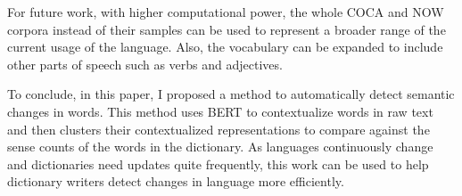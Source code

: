 \documentclass[11pt]{article}
\begin{document}
For future work, with higher computational power, the whole COCA and NOW corpora instead of their samples can be used to represent a broader range of the current usage of the language.
Also, the vocabulary can be expanded to include other parts of speech such as verbs and adjectives.

To conclude, in this paper, I proposed a method to automatically detect semantic changes in words.
This method uses BERT to contextualize words in raw text and then clusters their contextualized representations to compare against the sense counts of the words in the dictionary.
As languages continuously change and dictionaries need updates quite frequently, this work can be used to help dictionary writers detect changes in language more efficiently.



\end{document}
